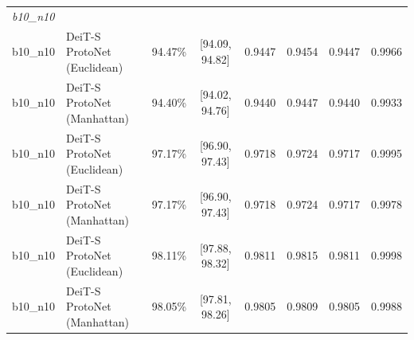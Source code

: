 \begin{table}[htbp]
\begin{tabular}{lllccccc}
\hline
\multicolumn{8}{l}{\textit{b10\_n10}} \\
b10\_n10 & DeiT-S ProtoNet (Euclidean) & 94.47\% & [94.09, 94.82] & 0.9447 & 0.9454 & 0.9447 & 0.9966 \\
b10\_n10 & DeiT-S ProtoNet (Manhattan) & 94.40\% & [94.02, 94.76] & 0.9440 & 0.9447 & 0.9440 & 0.9933 \\
b10\_n10 & DeiT-S ProtoNet (Euclidean) & 97.17\% & [96.90, 97.43] & 0.9718 & 0.9724 & 0.9717 & 0.9995 \\
b10\_n10 & DeiT-S ProtoNet (Manhattan) & 97.17\% & [96.90, 97.43] & 0.9718 & 0.9724 & 0.9717 & 0.9978 \\
b10\_n10 & DeiT-S ProtoNet (Euclidean) & 98.11\% & [97.88, 98.32] & 0.9811 & 0.9815 & 0.9811 & 0.9998 \\
b10\_n10 & DeiT-S ProtoNet (Manhattan) & 98.05\% & [97.81, 98.26] & 0.9805 & 0.9809 & 0.9805 & 0.9988 \\
\hline
\end{tabular}
\end{table}
